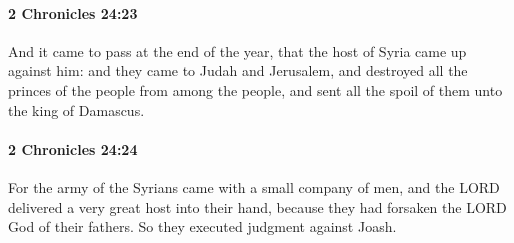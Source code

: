 		\paragraph{2 Chronicles 24:23} %
			\label{2CHRONICLES-24-23}

			And it came to pass at the end of the year, that the host of Syria came up against him: and they came to Judah and Jerusalem, and destroyed all the princes of the people from among the people, and sent all the spoil of them unto the king of Damascus.


		\paragraph{2 Chronicles 24:24} %
			\label{2CHRONICLES-24-24}

			For the army of the Syrians came with a small company of men, and the LORD delivered a very great host into their hand, because they had forsaken the LORD God of their fathers. So they executed judgment against Joash.

